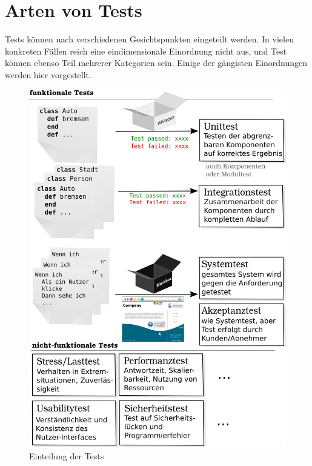
\section{Arten von Tests}
Tests können nach verschiedenen Gesichtspunkten eingeteilt werden. In vielen konkreten Fällen reich eine eindimensionale Einordnung nicht aus, und Test können ebenso Teil mehrerer Kategorien sein. Einige der gängisten Einordnungen werden hier vorgestellt.
\begin{figure}[hp]
 \centering
 \includegraphics[width=\textwidth]{./diagrams/testarten.png}
 \caption{Einteilung der Tests}
 \label{fig:testArten}
\end{figure}

